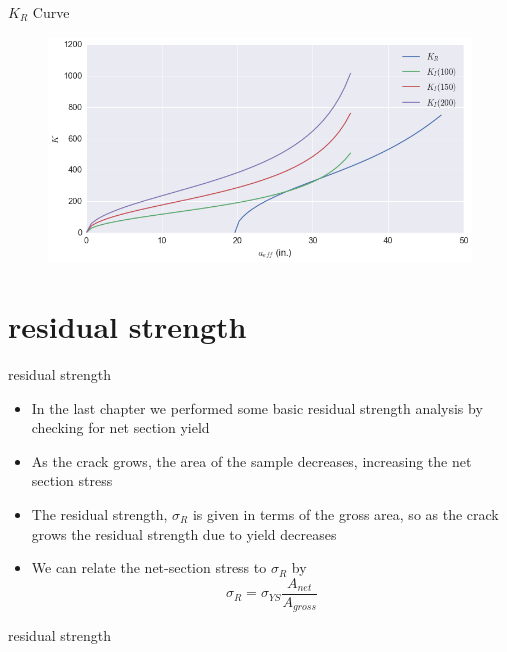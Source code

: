 \documentclass[10pt]{beamer}
\begin{document}
\begin{frame}{$K_R$ Curve}
	
\begin{figure}
\centering
\includegraphics[width=0.8\linewidth]{KR_curve}
\label{fig:KR_curve}
\end{figure}
\end{frame}

\section{residual strength}

\begin{frame}{residual strength}
	\begin{itemize}[<+->]
		\item In the last chapter we performed some basic residual strength analysis by checking for net section yield
		\item As the crack grows, the area of the sample decreases, increasing the net section stress
		\item The residual strength, $\sigma_R$ is given in terms of the gross area, so as the crack grows the residual strength due to yield decreases
		\item We can relate the net-section stress to $\sigma_R$ by
		\begin{equation}
		\sigma_R = \sigma_{YS} \frac{A_{net}}{A_{gross}}
		\end{equation}
	\end{itemize}
\end{frame}

\begin{frame}{residual strength}
	\begin{figure}
	\end{figure}
\end{frame}
\end{document}

